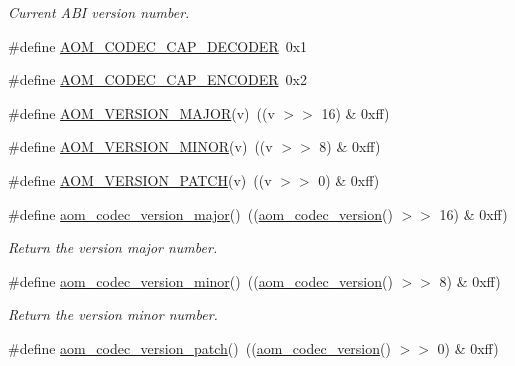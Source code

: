 \begin{DoxyCompactItemize}
\begin{DoxyCompactList}\small\item\em Current A\+BI version number. \end{DoxyCompactList}\item 
\#define \hyperlink{group__codec_gad362e3d79e8520028c790659c1c77174}{A\+O\+M\+\_\+\+C\+O\+D\+E\+C\+\_\+\+C\+A\+P\+\_\+\+D\+E\+C\+O\+D\+ER}~0x1
\item 
\#define \hyperlink{group__codec_ga59ba7a82c1363e296a0a4db618d4099a}{A\+O\+M\+\_\+\+C\+O\+D\+E\+C\+\_\+\+C\+A\+P\+\_\+\+E\+N\+C\+O\+D\+ER}~0x2
\item 
\#define \hyperlink{group__codec_gae198f814bc271e7706503bea7e9140a7}{A\+O\+M\+\_\+\+V\+E\+R\+S\+I\+O\+N\+\_\+\+M\+A\+J\+OR}(v)~((v $>$$>$ 16) \& 0xff)
\item 
\#define \hyperlink{group__codec_ga84347eb24e40542335b1497713cb4896}{A\+O\+M\+\_\+\+V\+E\+R\+S\+I\+O\+N\+\_\+\+M\+I\+N\+OR}(v)~((v $>$$>$ 8) \& 0xff)
\item 
\#define \hyperlink{group__codec_ga7f0bc2716f1f32a665acba56f55ae662}{A\+O\+M\+\_\+\+V\+E\+R\+S\+I\+O\+N\+\_\+\+P\+A\+T\+CH}(v)~((v $>$$>$ 0) \& 0xff)
\item 
\#define \hyperlink{group__codec_gaf35aecefb8133a5474d0068119e6182c}{aom\+\_\+codec\+\_\+version\+\_\+major}()~((\hyperlink{group__codec_gaaed56af63c70186d571ab44c72500e77}{aom\+\_\+codec\+\_\+version}() $>$$>$ 16) \& 0xff)\hypertarget{group__codec_gaf35aecefb8133a5474d0068119e6182c}{}\label{group__codec_gaf35aecefb8133a5474d0068119e6182c}

\begin{DoxyCompactList}\small\item\em Return the version major number. \end{DoxyCompactList}\item 
\#define \hyperlink{group__codec_gafc4f21abef83316131df07742b919d91}{aom\+\_\+codec\+\_\+version\+\_\+minor}()~((\hyperlink{group__codec_gaaed56af63c70186d571ab44c72500e77}{aom\+\_\+codec\+\_\+version}() $>$$>$ 8) \& 0xff)\hypertarget{group__codec_gafc4f21abef83316131df07742b919d91}{}\label{group__codec_gafc4f21abef83316131df07742b919d91}

\begin{DoxyCompactList}\small\item\em Return the version minor number. \end{DoxyCompactList}\item 
\#define \hyperlink{group__codec_gaf452ede024bf9a378fa66443494070ba}{aom\+\_\+codec\+\_\+version\+\_\+patch}()~((\hyperlink{group__codec_gaaed56af63c70186d571ab44c72500e77}{aom\+\_\+codec\+\_\+version}() $>$$>$ 0) \& 0xff)\hypertarget{group__codec_gaf452ede024bf9a378fa66443494070ba}{}\label{group__codec_gaf452ede024bf9a378fa66443494070ba}


\end{DoxyCompactItemize}
